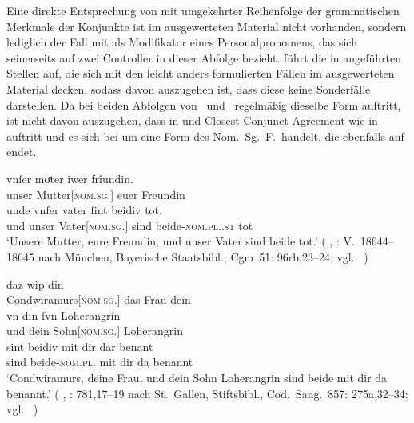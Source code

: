 Eine direkte Entsprechung von  mit umgekehrter Reihenfolge der
grammatischen Merkmale der Konjunkte ist im ausgewerteten Material nicht
vorhanden, sondern lediglich der Fall mit  als Modifikator
eines Personalpronomens, das sich seinerseits auf zwei Controller in dieser
Abfolge bezieht. \citet[96, 145]{askedal1973} führt die in
 angeführten Stellen auf, die sich mit den leicht anders
formulierten Fällen im ausgewerteten Material decken, sodass davon auszugehen
ist, dass diese keine Sonderfälle darstellen. Da bei beiden Abfolgen von
\MascM\ und \FemF\ regelmäßig dieselbe Form  auftritt, ist nicht
davon auszugehen, dass in  und  Closest
Conjunct Agreement wie in  auftritt und es sich bei 
um eine Form des Nom.~Sg.~F.\ handelt, die ebenfalls auf  endet.

\begin{exe}
	\ex \label{ex:askfmbeidiu}
		\begin{xlist}
		\ex \gll vnſer moͮter iwer frîundin. \\
				unser Mutter[\textsc{nom.sg.\FemF}] euer Freundin \\
		\sn \gll unde vnſer vater ſint beidiv tot. \\
				und unser Vater[\textsc{nom.sg.\MascM}] sind beide-\textsc{nom.pl.\NeutMF.st} 
					tot \\
			\trans `Unsere Mutter, eure Freundin, und unser Vater sind beide
				tot.'
				(%
					, : V.~18644--18645
					nach München, Bayerische Staatsbibl., Cgm~51: 96rb,23--24;
					vgl.~\cite[259]{maroldschroeder1969}%
				)
			\label{ex:askfmbeidiu_1}
	
		\ex {} daz wip din \\
				Condwiramurs[\textsc{nom.sg.\FemF}] das Frau dein \\
		\sn \gll vn̄ din ſvn Loherangrin \\
				und dein Sohn[\textsc{nom.sg.\MascM}] Loherangrin \\
		\sn \gll sint beidiv mit dir dar benant \\
				sind beide-\textsc{nom.pl.\NeutMF} mit dir da benannt \\
		\trans `Condwiramurs, deine Frau, und dein Sohn Loherangrin
			sind beide mit dir da benannt.'
			(%
				, : 781,17--19
				nach St.~Gallen, Stiftsbibl., Cod.~Sang.~857: 275a,32--34;
				vgl.~\cite[785]{knechtschirok2003}%
			)
			\label{ex:askfmbeidiu_2}
	\end{xlist}
\end{exe}

